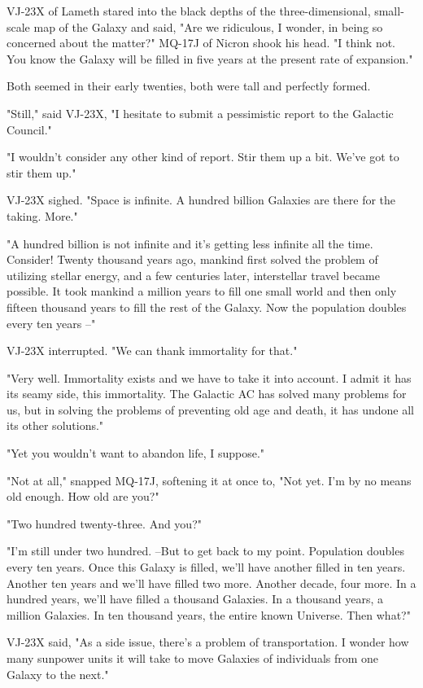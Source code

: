 \documentclass[11pt,twocolumn,paper=a5,pagesize]{article}
\newcommand{\futuretwo}[1]{ #1 }
\newcommand{\initial}[1]{ \lettrine[lines=3,lhang=0.3,nindent=0em]{  {\textsf{#1}}}{}}
\begin{document}
\futuretwo{
\initial{V}J-23X of Lameth stared into the black depths of the three-dimensional, small-scale map of the Galaxy and said, "Are we ridiculous, I wonder, in being so concerned about the matter?"
MQ-17J of Nicron shook his head. "I think not. You know the Galaxy will be filled in five years at the present rate of expansion."

Both seemed in their early twenties, both were tall and perfectly formed.

"Still," said VJ-23X, "I hesitate to submit a pessimistic report to the Galactic Council."

"I wouldn't consider any other kind of report. Stir them up a bit. We've got to stir them up."

VJ-23X sighed. "Space is infinite. A hundred billion Galaxies are there for the taking. More."

"A hundred billion is not infinite and it's getting less infinite all the time. Consider! Twenty thousand years ago, mankind first solved the problem of utilizing stellar energy, and a few centuries later, interstellar travel became possible. It took mankind a million years to fill one small world and then only fifteen thousand years to fill the rest of the Galaxy. Now the population doubles every ten years --"

VJ-23X interrupted. "We can thank immortality for that."

"Very well. Immortality exists and we have to take it into account. I admit it has its seamy side, this immortality. The Galactic AC has solved many problems for us, but in solving the problems of preventing old age and death, it has undone all its other solutions."

"Yet you wouldn't want to abandon life, I suppose."

"Not at all," snapped MQ-17J, softening it at once to, "Not yet. I'm by no means old enough. How old are you?"

"Two hundred twenty-three. And you?"

"I'm still under two hundred. --But to get back to my point. Population doubles every ten years. Once this Galaxy is filled, we'll have another filled in ten years. Another ten years and we'll have filled two more. Another decade, four more. In a hundred years, we'll have filled a thousand Galaxies. In a thousand years, a million Galaxies. In ten thousand years, the entire known Universe. Then what?"

VJ-23X said, "As a side issue, there's a problem of transportation. I wonder how many sunpower units it will take to move Galaxies of individuals from one Galaxy to the next."

}
\end{document}
